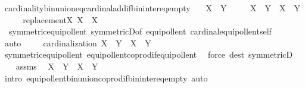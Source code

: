 \begin{isabellebody}
\ cardinality{\isacharunderscore}{\kern0pt}bin{\isacharunderscore}{\kern0pt}union{\isacharunderscore}{\kern0pt}eq{\isacharunderscore}{\kern0pt}cardinal{\isacharunderscore}{\kern0pt}add{\isacharunderscore}{\kern0pt}if{\isacharunderscore}{\kern0pt}bin{\isacharunderscore}{\kern0pt}inter{\isacharunderscore}{\kern0pt}eq{\isacharunderscore}{\kern0pt}empty{\isacharcolon}{\kern0pt}\isanewline
\ \ \ {\isachardoublequoteopen}X\ {\isasyminter}\ Y\ {\isacharequal}{\kern0pt}\ {\isacharbraceleft}{\kern0pt}{\isacharbraceright}{\kern0pt}{\isachardoublequoteclose}\isanewline
\ \ \ {\isachardoublequoteopen}{\isacharbar}{\kern0pt}X\ {\isasymunion}\ Y{\isacharbar}{\kern0pt}\ {\isacharequal}{\kern0pt}\ {\isacharbar}{\kern0pt}X{\isacharbar}{\kern0pt}\ {\isasymoplus}\ {\isacharbar}{\kern0pt}Y{\isacharbar}{\kern0pt}{\isachardoublequoteclose}\isanewline
%
\isadelimproof
%
\endisadelimproof
%
\isatagproof
{}\isamarkupfalse%
\ {\isacharminus}{\kern0pt}\isanewline
\ \ \isamarkupfalse%
\ replacement{\isacharcolon}{\kern0pt}{\isachardoublequoteopen}{\isasymAnd}X{\isachardot}{\kern0pt}\ X\ {\isasymapprox}\ {\isacharbar}{\kern0pt}X{\isacharbar}{\kern0pt}{\isachardoublequoteclose}\ \ \isanewline
\ \ \ \ \isamarkupfalse%
\ \ symmetric{\isacharunderscore}{\kern0pt}equipollent\ symmetricD{\isacharbrackleft}{\kern0pt}of\ equipollent{\isacharbrackright}{\kern0pt}\ cardinal{\isacharunderscore}{\kern0pt}equipollent{\isacharunderscore}{\kern0pt}self\isanewline
\ \ \ \ \isamarkupfalse%
\ auto\ \isanewline
\ \ \isamarkupfalse%
\ cardinalization{\isacharcolon}{\kern0pt}\ {\isachardoublequoteopen}X\ {\isasymCoprod}\ Y\ {\isasymapprox}\ {\isacharbar}{\kern0pt}X{\isacharbar}{\kern0pt}\ {\isasymCoprod}\ {\isacharbar}{\kern0pt}Y{\isacharbar}{\kern0pt}{\isachardoublequoteclose}\isanewline
\ \ \ \ \isamarkupfalse%
\ symmetric{\isacharunderscore}{\kern0pt}equipollent\ equipollent{\isacharunderscore}{\kern0pt}coprod{\isacharunderscore}{\kern0pt}if{\isacharunderscore}{\kern0pt}equipollent\ \isamarkupfalse%
\ {\isacharparenleft}{\kern0pt}force\ dest{\isacharcolon}{\kern0pt}\ symmetricD{\isacharparenright}{\kern0pt}\isanewline
\ \ \isamarkupfalse%
\ assms\ \isamarkupfalse%
\ {\isachardoublequoteopen}X\ {\isasymunion}\ Y\ {\isasymapprox}\ X\ {\isasymCoprod}\ Y{\isachardoublequoteclose}\ \isamarkupfalse%
\ {\isacharparenleft}{\kern0pt}intro\ equipollent{\isacharunderscore}{\kern0pt}bin{\isacharunderscore}{\kern0pt}union{\isacharunderscore}{\kern0pt}coprod{\isacharunderscore}{\kern0pt}if{\isacharunderscore}{\kern0pt}bin{\isacharunderscore}{\kern0pt}inter{\isacharunderscore}{\kern0pt}eq{\isacharunderscore}{\kern0pt}empty{\isacharparenright}{\kern0pt}\ auto\isanewline

\end{isabellebody}

